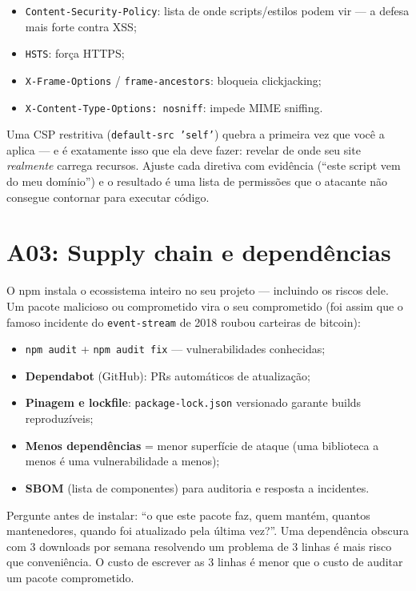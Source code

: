 \begin{itemize}[leftmargin=*, itemsep=0.4em]
  \item \texttt{Content-Security-Policy}: lista de onde scripts/estilos podem vir — a defesa mais forte contra XSS;
  \item \texttt{HSTS}: força HTTPS;
  \item \texttt{X-Frame-Options} / \texttt{frame-ancestors}: bloqueia clickjacking;
  \item \texttt{X-Content-Type-Options: nosniff}: impede MIME sniffing.
\end{itemize}

\begin{caixadica}
Uma CSP restritiva (\texttt{default-src 'self'}) quebra a primeira vez que
você a aplica — e é exatamente isso que ela deve fazer: revelar de onde seu
site \emph{realmente} carrega recursos. Ajuste cada diretiva com evidência
(``este script vem do meu domínio'') e o resultado é uma lista de permissões
que o atacante não consegue contornar para executar código.
\end{caixadica}

\section{A03: Supply chain e dependências}

O npm instala o ecossistema inteiro no seu projeto — incluindo os riscos dele.
Um pacote malicioso ou comprometido vira o seu comprometido (foi assim que o
famoso incidente do \texttt{event-stream} de 2018 roubou carteiras de
bitcoin):

\begin{itemize}[leftmargin=*, itemsep=0.4em]
  \item \texttt{npm audit} + \texttt{npm audit fix} — vulnerabilidades conhecidas;
  \item \textbf{Dependabot} (GitHub): PRs automáticos de atualização;
  \item \textbf{Pinagem e lockfile}: \texttt{package-lock.json} versionado garante builds reproduzíveis;
  \item \textbf{Menos dependências} = menor superfície de ataque (uma biblioteca a menos é uma vulnerabilidade a menos);
  \item \textbf{SBOM} (lista de componentes) para auditoria e resposta a incidentes.
\end{itemize}

\begin{caixaconceito}
Pergunte antes de instalar: ``o que este pacote faz, quem mantém, quantos
mantenedores, quando foi atualizado pela última vez?''. Uma dependência
obscura com 3 downloads por semana resolvendo um problema de 3 linhas é mais
risco que conveniência. O custo de escrever as 3 linhas é menor que o custo de
auditar um pacote comprometido.
\end{caixaconceito}

